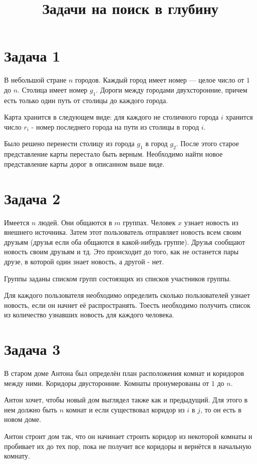 \documentclass{extarticle}
\date{}
\title{Задачи на поиск в глубину}
\begin{document}
\section*{Задача 1}
\label{sec:orgbf94f14}
В небольшой стране \(n\) городов.
Каждый город имеет номер — целое число от \(1\) до \(n\).
Столица имеет номер \(g_{1}\).
Дороги между городами двухсторонние, причем
есть только один путь от столицы до каждого города.

Карта хранится в следующем виде:
для каждого не столичного города \(i\) хранится число \(r_{i}\) -
номер последнего города на пути из столицы в город \(i\).

Было решено перенести столицу из города \(g_{1}\) в город \(g_{2}\).
После этого старое представление карты перестало быть верным.
Необходимо найти новое представление карты дорог в описанном выше виде.

\section*{Задача 2}
\label{sec:org0cfcf12}
Имеется \(n\) людей. Они общаются в \(m\) группах.
Человек \(x\) узнает новость из внешнего источника.
Затем этот пользователь отправляет новость всем своим друзьям
(друзья если оба общаются в какой-нибудь группе).
Друзья сообщают новость своим друзьям и тд.
Это происходит до того, как не останется пары друзе, в которой один
знает новость, а другой - нет.

Группы заданы списком групп состоязщих из списков участников группы.

Для каждого пользователя необходимо определить сколько пользователей узнает
новость, если он начнет её распространять.
Тоесть необходимо получить список из количество узнавших новость для каждого человека.

\section*{Задача 3}
\label{sec:org4ca004e}
В старом доме Антона был определён план
расположения комнат и коридоров между ними.
Коридоры двусторонние.
Комнаты пронумерованы от \(1\) до \(n\).

Антон хочет, чтобы новый дом выглядел также как и предыдущий.
Для этого в нем должно быть \(n\) комнат и если существовал
коридор из \(i\) в \(j\), то он есть в новом доме.

Антон строит дом так, что он начинает строить коридор из
некоторой комнаты и пробивает их до тех пор, пока
не получит все коридоры и вернётся в начальную комнату.
\end{document}
